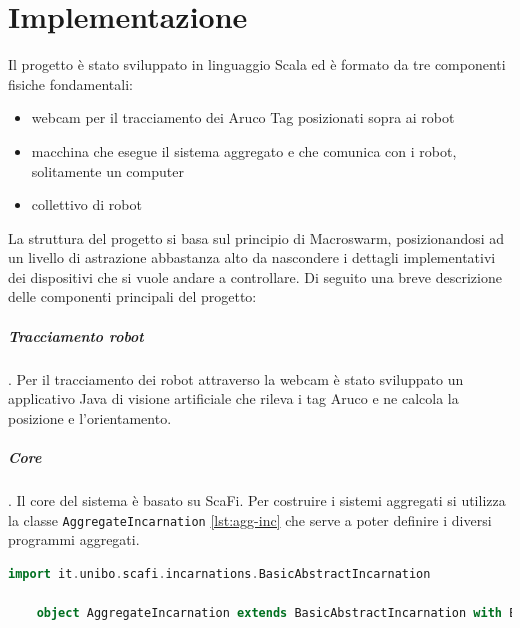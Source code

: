 \documentclass[12pt,a4paper,openright,twoside]{book}
\begin{document}
\chapter{Implementazione}
\label{chap:implementazione}

Il progetto è stato sviluppato in linguaggio Scala ed è formato da tre componenti fisiche fondamentali:
\begin{itemize}
    \item webcam per il tracciamento dei Aruco Tag posizionati sopra ai robot
    \item macchina che esegue il sistema aggregato e che comunica con i robot, solitamente un computer
    \item collettivo di robot
\end{itemize}

La struttura del progetto si basa sul principio di Macroswarm, posizionandosi ad un livello di astrazione abbastanza alto da nascondere i dettagli implementativi dei dispositivi che si vuole andare a controllare. Di seguito una breve descrizione delle componenti principali del progetto:

\paragraph{Tracciamento robot}.
Per il tracciamento dei robot attraverso la webcam è stato sviluppato un applicativo Java di visione artificiale che rileva i tag Aruco e ne calcola la posizione e l'orientamento.

\paragraph{Core}. 
Il core del sistema è basato su ScaFi.
Per costruire i sistemi aggregati si utilizza la classe \verb|AggregateIncarnation| \cref{lst:agg-inc} che serve a poter definire i diversi programmi aggregati.

\begin{lstlisting}[language=Scala, label={lst:agg-inc}, caption={Classe AggregateIncarnation}]
    import it.unibo.scafi.incarnations.BasicAbstractIncarnation

    object AggregateIncarnation extends BasicAbstractIncarnation with BuildingBlocks
\end{lstlisting}
\end{document}
